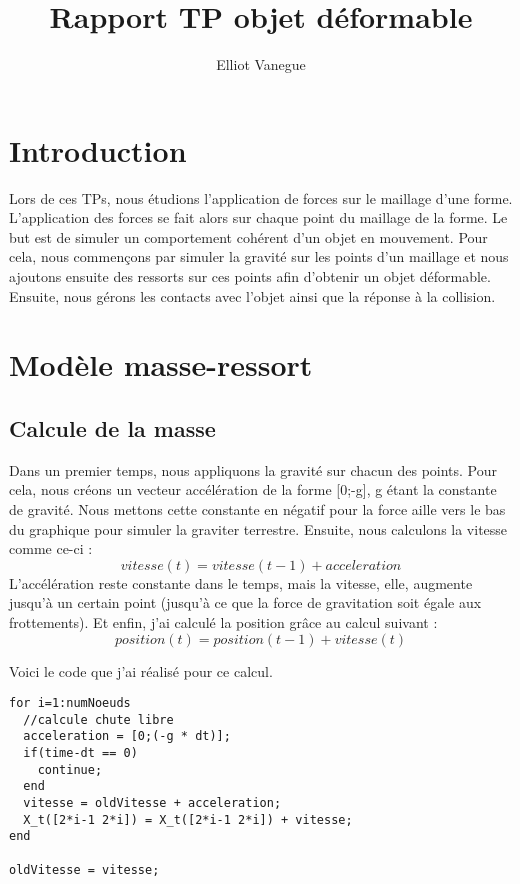 \documentclass[a4paper,11pt]{article}
\title{Rapport TP objet déformable}
\author{Elliot Vanegue}
\begin{document}
\maketitle

\section{Introduction}
Lors de ces TPs, nous étudions l'application de forces sur le maillage d'une
forme. L'application des forces se fait alors sur chaque point du maillage de la forme.
Le but est de simuler un comportement cohérent d'un objet en mouvement. Pour cela, nous 
commençons par simuler la gravité sur les points d'un maillage et nous ajoutons
ensuite des ressorts sur ces points afin d'obtenir un objet déformable. Ensuite, nous 
gérons les contacts avec l'objet ainsi que la réponse à la collision.  

\section{Modèle masse-ressort}
\subsection{Calcule de la masse}
Dans un premier temps, nous appliquons la gravité sur chacun des points.
Pour cela, nous créons un vecteur accélération de la forme [0;-g], g étant la constante
de gravité. Nous mettons cette constante en négatif pour la force aille vers le bas
du graphique pour simuler la graviter terrestre. Ensuite, nous calculons la vitesse comme ce-ci :
\begin{equation}
vitesse(t) = vitesse(t-1) + acceleration
\end{equation}
L'accélération reste constante dans le temps, mais la vitesse, elle, augmente jusqu'à un certain
point (jusqu'à ce que la force de gravitation soit égale aux frottements). Et enfin, j'ai calculé la position grâce au calcul suivant : 
\begin{equation}
position(t) = position(t-1) + vitesse(t)
\end{equation}

Voici le code que j'ai réalisé pour ce calcul.
\begin{lstlisting}[caption=Code du Calcul de la gravité]
for i=1:numNoeuds
  //calcule chute libre
  acceleration = [0;(-g * dt)];
  if(time-dt == 0)
    continue;
  end
  vitesse = oldVitesse + acceleration;
  X_t([2*i-1 2*i]) = X_t([2*i-1 2*i]) + vitesse;
end
    
oldVitesse = vitesse;
\end{lstlisting}
\end{document}

